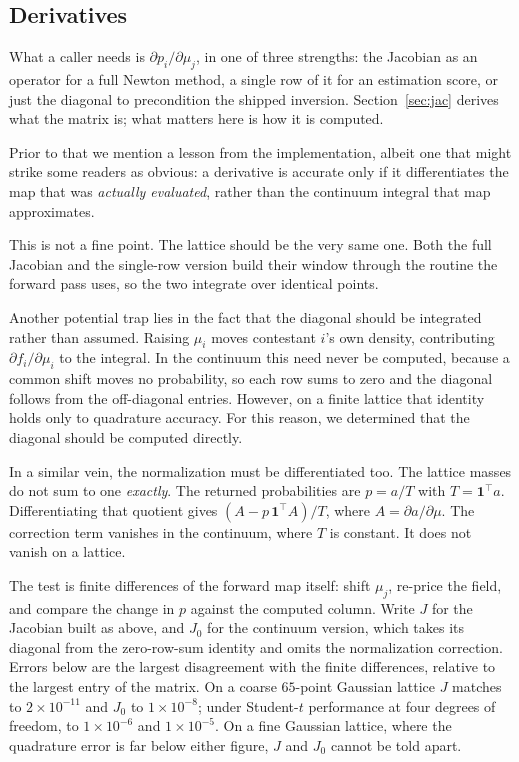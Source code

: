 \documentclass[11pt]{article}
\begin{document}
\subsection{Derivatives}

What a caller needs is
$\partial p_i/\partial\mu_j$, in one of three strengths: the Jacobian as
an operator for a full Newton method, a single row of it for an
estimation score, or just the diagonal to precondition the shipped
inversion. Section~\ref{sec:jac} derives what the matrix is; what
matters here is how it is computed.

Prior to that we mention a lesson from the implementation, albeit one
that might strike some readers as obvious: a derivative is accurate only
if it differentiates the map that was \emph{actually evaluated}, rather
than the continuum integral that map approximates.

This is not a fine point. The lattice should be the very same one. Both the full Jacobian and the single-row version build their window through the routine the forward
pass uses, so the two integrate over identical points.

Another potential trap lies in the fact that the diagonal should be integrated rather than assumed. Raising $\mu_i$
moves contestant $i$'s own density, contributing $\partial
f_i/\partial\mu_i$ to the integral. In the continuum this need never be
computed, because a common shift moves no probability, so each row sums to zero
and the diagonal follows from the off-diagonal entries. However, on a finite
lattice that identity holds only to quadrature accuracy. For this
reason, we determined that the diagonal should be computed directly.

In a similar vein, the normalization must be differentiated too. The lattice masses do
not sum to one \emph{exactly}. The returned probabilities are $p=a/T$ with
$T=\mathbf{1}^{\top}a$. Differentiating that quotient gives
$(A-p\,\mathbf{1}^{\top}A)/T$, where $A=\partial a/\partial\mu$. The
correction term vanishes in the continuum, where $T$ is constant. It does not vanish on a lattice.

The test is finite differences of the forward map itself: shift $\mu_j$,
re-price the field, and compare the change in $p$ against the computed
column. Write $J$ for the Jacobian built as above, and $J_0$ for the
continuum version, which takes its diagonal from the zero-row-sum
identity and omits the normalization correction. Errors below are the
largest disagreement with the finite differences, relative to the largest
entry of the matrix. On a coarse $65$-point Gaussian lattice $J$ matches
to $2\times10^{-11}$ and $J_0$ to $1\times10^{-8}$; under Student-$t$
performance at four degrees of freedom, to $1\times10^{-6}$ and
$1\times10^{-5}$. On a fine Gaussian lattice, where the quadrature error
is far below either figure, $J$ and $J_0$ cannot be told apart.
\end{document}
